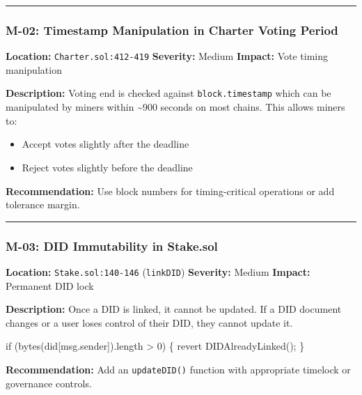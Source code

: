 \documentclass[
]{article}
\newenvironment{Shaded}{}{}
\newcommand{\NormalTok}[1]{#1}
\providecommand{\tightlist}{%
  \setlength{\itemsep}{0pt}\setlength{\parskip}{0pt}}
\begin{document}
\begin{center}\rule{0.5\linewidth}{0.5pt}\end{center}

\subsubsection{M-02: Timestamp Manipulation in Charter Voting
Period}\label{m-02-timestamp-manipulation-in-charter-voting-period}

\textbf{Location:} \texttt{Charter.sol:412-419} \textbf{Severity:}
Medium \textbf{Impact:} Vote timing manipulation

\textbf{Description:} Voting end is checked against
\texttt{block.timestamp} which can be manipulated by miners within
\textasciitilde900 seconds on most chains. This allows miners to:

\begin{itemize}
\tightlist
\item
  Accept votes slightly after the deadline
\item
  Reject votes slightly before the deadline
\end{itemize}

\textbf{Recommendation:} Use block numbers for timing-critical
operations or add tolerance margin.

\begin{center}\rule{0.5\linewidth}{0.5pt}\end{center}

\subsubsection{M-03: DID Immutability in
Stake.sol}\label{m-03-did-immutability-in-stakesol}

\textbf{Location:} \texttt{Stake.sol:140-146} (\texttt{linkDID})
\textbf{Severity:} Medium \textbf{Impact:} Permanent DID lock

\textbf{Description:} Once a DID is linked, it cannot be updated. If a
DID document changes or a user loses control of their DID, they cannot
update it.

\begin{Shaded}
\begin{Highlighting}[]
\NormalTok{if (bytes(did[msg.sender]).length \textgreater{} 0) \{}
\NormalTok{    revert DIDAlreadyLinked();}
\NormalTok{\}}
\end{Highlighting}
\end{Shaded}

\textbf{Recommendation:} Add an \texttt{updateDID()} function with
appropriate timelock or governance controls.
\end{document}
